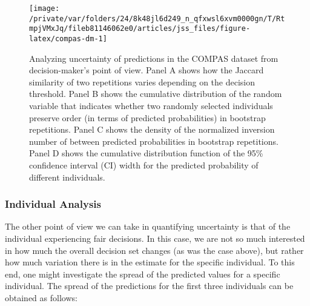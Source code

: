 \documentclass[
  nojss]{jss}
\begin{document}
\begin{CodeChunk}
\begin{figure}

{\centering \texttt{[image: /private/var/folders/24/8k48jl6d249\_n\_qfxwsl6xvm0000gn/T/RtmpjVMxJq/fileb81146062e0/articles/jss\_files/figure-latex/compas-dm-1]} 

}

\caption[Analyzing uncertainty of predictions in the COMPAS dataset from decision-maker's point of view]{Analyzing uncertainty of predictions in the COMPAS dataset from decision-maker's point of view. Panel A shows how the Jaccard similarity of two repetitions varies depending on the decision threshold. Panel B shows the cumulative distribution of the random variable that indicates whether two randomly selected individuals preserve order (in terms of predicted probabilities) in bootstrap repetitions. Panel C shows the density of the normalized inversion number of between predicted probabilities in bootstrap repetitions. Panel D shows the cumulative distribution function of the 95\% confidence interval (CI) width for the predicted probability of different individuals.}\label{fig:compas-dm}
\end{figure}
\end{CodeChunk}

\hypertarget{individual-analysis}{%
\subsubsection{Individual Analysis}\label{individual-analysis}}

The other point of view we can take in quantifying uncertainty is that
of the individual experiencing fair decisions. In this case, we are not
so much interested in how much the overall decision set changes (as was
the case above), but rather how much variation there is in the estimate
for the specific individual. To this end, one might investigate the
spread of the predicted values for a specific individual. The spread of
the predictions for the first three individuals can be obtained as
follows:

\begin{CodeChunk}
\end{CodeChunk}
\end{document}

